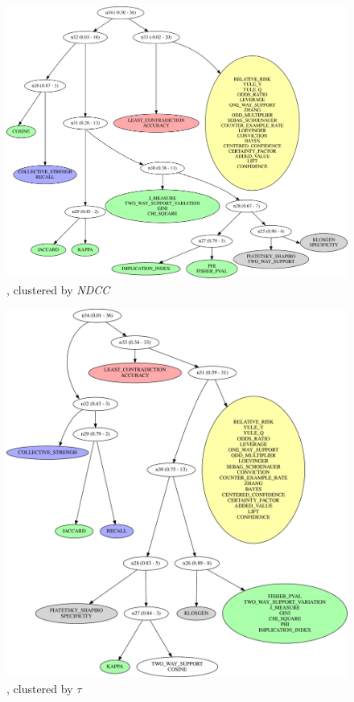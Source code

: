 \begin{figure}[th!]
  \begin{center}
  \includegraphics[width=\textwidth]{svg/rankingcom/patterns_demo-perTarget-NDCG.pdf}
  \caption{\demoassoc, clustered by {\em NDCC}}
  \end{center}
\end{figure}


\begin{figure}[th!]
  \begin{center}
  \includegraphics[width=\textwidth]{svg/rankingcom/patterns_prods_per_ticket-perTarget-KENDAL.pdf}
  \caption{\prodassocreceipt, clustered by $\tau$}
  \end{center}
\end{figure}

